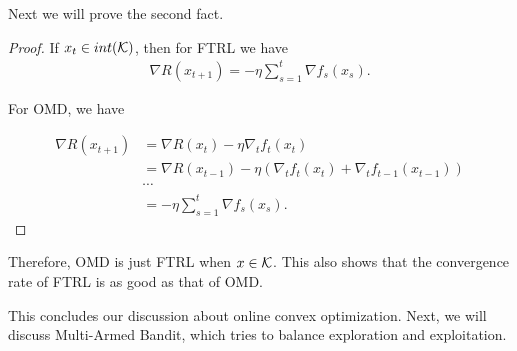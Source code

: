\documentclass[../main.tex]{subfiles}
\begin{document}
Next we will prove the second fact.

\begin{proof}
	If $x_t \in int(\mathcal{K})$, then for FTRL we have
	\begin{equation*}
		\begin{aligned}
			\nabla R(x_{t+1})  = - \eta \sum\limits_{s=1}^t \nabla f_s(x_s)  .
		\end{aligned}
	\end{equation*}

For OMD, we have

	\begin{equation*}
		\begin{aligned}
			\nabla R(x_{t+1}) &  = \nabla R(x_t) - \eta \nabla_t f_t(x_t) \\
							 & = \nabla R(x_{t-1}) - \eta (\nabla_t f_t(x_t) + \nabla_t f_{t-1}(x_{t-1})) \\
							 & \cdots \\
							 & = - \eta \sum\limits_{s=1}^t \nabla f_s(x_s) .
		\end{aligned}
	\end{equation*}
\end{proof}

Therefore, OMD is just FTRL when $x \in \mathcal{K}$. This also shows that the convergence rate of FTRL is as good as that of OMD.

This concludes our discussion about online convex optimization. Next, we will discuss Multi-Armed Bandit, which tries to balance exploration and exploitation.
\end{document}
